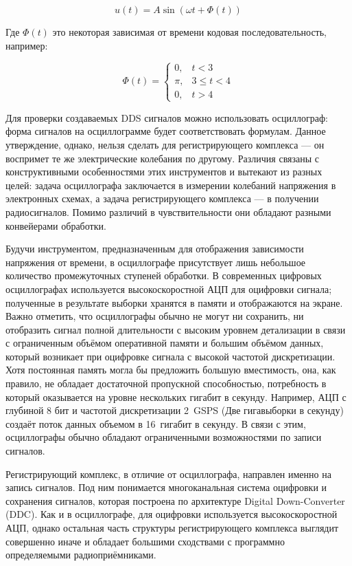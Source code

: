 \documentclass{report}
\begin{document}
\begin{equation}
u(t) = A \sin (\omega t + \Phi(t))
\end{equation}

Где $\Phi(t)$ это некоторая зависимая от времени кодовая последовательность, например:

\begin{equation}
\Phi(t) =
\begin{cases}
0, & t < 3 \\
\pi, & 3 \le t < 4 \\
0, & t > 4
\end{cases}
\end{equation}

Для проверки создаваемых DDS сигналов можно использовать осциллограф: форма сигналов на осциллограмме будет соответствовать формулам. Данное утверждение, однако, нельзя сделать для регистрирующего комплекса --- он воспримет те же электрические колебания по другому. Различия связаны с конструктивными особенностями этих инструментов и вытекают из разных целей: задача осциллографа заключается в измерении колебаний напряжения в электронных схемах, а задача регистрирующего комплекса --- в получении радиосигналов. Помимо различий в чувствительности они обладают разными конвейерами обработки.

Будучи инструментом, предназначенным для отображения зависимости напряжения от времени, в осциллографе присутствует лишь небольшое количество промежуточных ступеней обработки. В современных цифровых осциллографах используется высокоскоростной АЦП для оцифровки сигнала; полученные в результате выборки хранятся в памяти и отображаются на экране. Важно отметить, что осциллографы обычно не могут ни сохранить, ни отобразить сигнал полной длительности с высоким уровнем детализации в связи с ограниченным объёмом оперативной памяти и большим объёмом данных, который возникает при оцифровке сигнала с высокой частотой дискретизации. Хотя постоянная память могла бы предложить большую вместимость, она, как правило, не обладает достаточной пропускной способностью, потребность в который оказывается на уровне нескольких гигабит в секунду. Например, АЦП с глубиной 8 бит и частотой дискретизации 2~GSPS (Две гигавыборки в секунду) создаёт поток данных объемом в 16~гигабит в секунду. В связи с этим, осциллографы обычно обладают ограниченными возможностями по записи сигналов.

Регистрирующий комплекс, в отличие от осциллографа, направлен именно на запись сигналов. Под ним понимается многоканальная система оцифровки и сохранения сигналов, которая построена по архитектуре Digital Down-Converter (DDC). Как и в осциллографе, для оцифровки используется высокоскоростной АЦП, однако остальная часть структуры регистрирующего комплекса выглядит совершенно иначе и обладает большими сходствами с программно определяемыми радиоприёмниками.
\end{document}
